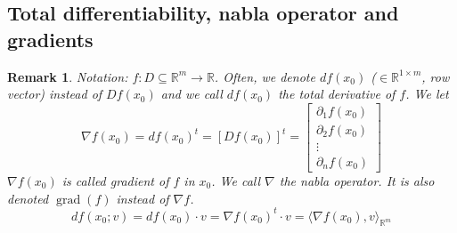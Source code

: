 \documentclass{article}
\newtheorem{remark}{Remark}  \numberwithin{remark}{section}
\begin{document}
\subsection{Total differentiability, nabla operator and gradients}
\begin{remark}
  Notation: $f: D \subseteq \mathbb R^m \to \mathbb R$.
  Often, we denote $df(x_0)$ ($\in \mathbb R^{1 \times m}$, row vector) instead of $Df(x_0)$
  and we call $df(x_0)$ the \emph{total derivative of $f$}. We let
  \[
    \nabla f(x_0) = df(x_0)^t = \left[Df(x_0)\right]^t
    = \begin{bmatrix} \partial_1 f(x_0) \\ \partial_2 f(x_0) \\ \vdots \\ \partial_n f(x_0) \end{bmatrix}
  \]
  $\nabla f(x_0)$ is called \emph{gradient of $f$ in $x_0$}.
  We call $\nabla$ the \emph{nabla operator}. It is also denoted $\operatorname{grad}(f)$ instead of $\nabla f$.
  \[ df(x_0; v) = df(x_0) \cdot v = \nabla f(x_0)^t \cdot v = \langle \nabla f(x_0), v\rangle_{\mathbb R^m} \]
\end{remark}
\end{document}
